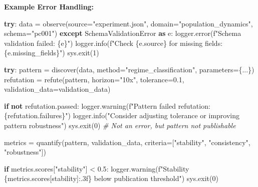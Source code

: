 \documentclass[
]{article}
\newenvironment{Shaded}{}{}
\newcommand{\CommentTok}[1]{\textcolor[rgb]{0.38,0.63,0.69}{\textit{#1}}}
\newcommand{\ControlFlowTok}[1]{\textcolor[rgb]{0.00,0.44,0.13}{\textbf{#1}}}
\newcommand{\DecValTok}[1]{\textcolor[rgb]{0.25,0.63,0.44}{#1}}
\newcommand{\FloatTok}[1]{\textcolor[rgb]{0.25,0.63,0.44}{#1}}
\newcommand{\ImportTok}[1]{\textcolor[rgb]{0.00,0.50,0.00}{\textbf{#1}}}
\newcommand{\KeywordTok}[1]{\textcolor[rgb]{0.00,0.44,0.13}{\textbf{#1}}}
\newcommand{\NormalTok}[1]{#1}
\newcommand{\OperatorTok}[1]{\textcolor[rgb]{0.40,0.40,0.40}{#1}}
\newcommand{\SpecialCharTok}[1]{\textcolor[rgb]{0.25,0.44,0.63}{#1}}
\newcommand{\SpecialStringTok}[1]{\textcolor[rgb]{0.73,0.40,0.53}{#1}}
\newcommand{\StringTok}[1]{\textcolor[rgb]{0.25,0.44,0.63}{#1}}
\begin{document}
\textbf{Example Error Handling:}

\begin{Shaded}
\begin{Highlighting}[]
\ControlFlowTok{try}\NormalTok{:}
\NormalTok{    data }\OperatorTok{=}\NormalTok{ observe(source}\OperatorTok{=}\StringTok{"experiment.json"}\NormalTok{, domain}\OperatorTok{=}\StringTok{"population\_dynamics"}\NormalTok{, schema}\OperatorTok{=}\StringTok{"pc001"}\NormalTok{)}
\ControlFlowTok{except}\NormalTok{ SchemaValidationError }\ImportTok{as}\NormalTok{ e:}
\NormalTok{    logger.error(}\SpecialStringTok{f"Schema validation failed: }\SpecialCharTok{\{}\NormalTok{e}\SpecialCharTok{\}}\SpecialStringTok{"}\NormalTok{)}
\NormalTok{    logger.info(}\SpecialStringTok{f"Check }\SpecialCharTok{\{}\NormalTok{e}\SpecialCharTok{.}\NormalTok{source}\SpecialCharTok{\}}\SpecialStringTok{ for missing fields: }\SpecialCharTok{\{}\NormalTok{e}\SpecialCharTok{.}\NormalTok{missing\_fields}\SpecialCharTok{\}}\SpecialStringTok{"}\NormalTok{)}
\NormalTok{    sys.exit(}\DecValTok{1}\NormalTok{)}

\ControlFlowTok{try}\NormalTok{:}
\NormalTok{    pattern }\OperatorTok{=}\NormalTok{ discover(data, method}\OperatorTok{=}\StringTok{"regime\_classification"}\NormalTok{, parameters}\OperatorTok{=}\NormalTok{\{...\})}
\NormalTok{    refutation }\OperatorTok{=}\NormalTok{ refute(pattern, horizon}\OperatorTok{=}\StringTok{"10x"}\NormalTok{, tolerance}\OperatorTok{=}\FloatTok{0.1}\NormalTok{, validation\_data}\OperatorTok{=}\NormalTok{validation\_data)}

    \ControlFlowTok{if} \KeywordTok{not}\NormalTok{ refutation.passed:}
\NormalTok{        logger.warning(}\SpecialStringTok{f"Pattern failed refutation: }\SpecialCharTok{\{}\NormalTok{refutation}\SpecialCharTok{.}\NormalTok{failures}\SpecialCharTok{\}}\SpecialStringTok{"}\NormalTok{)}
\NormalTok{        logger.info(}\StringTok{"Consider adjusting tolerance or improving pattern robustness"}\NormalTok{)}
\NormalTok{        sys.exit(}\DecValTok{0}\NormalTok{)  }\CommentTok{\# Not an error, but pattern not publishable}

\NormalTok{    metrics }\OperatorTok{=}\NormalTok{ quantify(pattern, validation\_data, criteria}\OperatorTok{=}\NormalTok{[}\StringTok{"stability"}\NormalTok{, }\StringTok{"consistency"}\NormalTok{, }\StringTok{"robustness"}\NormalTok{])}

    \ControlFlowTok{if}\NormalTok{ metrics.scores[}\StringTok{"stability"}\NormalTok{] }\OperatorTok{\textless{}} \FloatTok{0.5}\NormalTok{:}
\NormalTok{        logger.warning(}\SpecialStringTok{f"Stability }\SpecialCharTok{\{}\NormalTok{metrics}\SpecialCharTok{.}\NormalTok{scores[}\StringTok{\textquotesingle{}stability\textquotesingle{}}\NormalTok{]}\SpecialCharTok{:.3f\}}\SpecialStringTok{ below publication threshold"}\NormalTok{)}
\NormalTok{        sys.exit(}\DecValTok{0}\NormalTok{)}


\end{Highlighting}
\end{Shaded}
\end{document}
